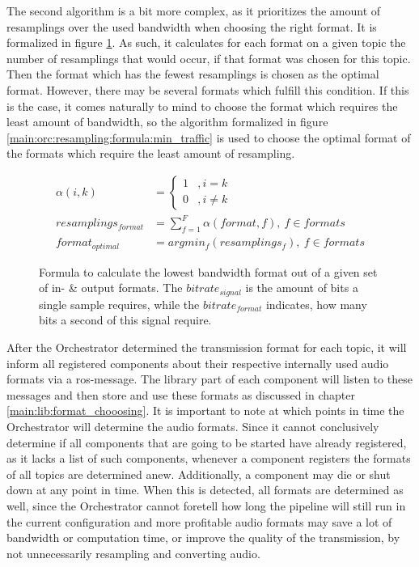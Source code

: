 The second algorithm is a bit more complex, as it prioritizes the amount of resamplings over the used bandwidth when choosing the right format.
It is formalized in figure \ref{main:orc:resampling:formula:min_cpu}.
As such, it calculates for each format on a given topic the number of resamplings that would occur, if that format was chosen for this topic.
Then the format which has the fewest resamplings is chosen as the optimal format.
However, there may be several formats which fulfill this condition.
If this is the case, it comes naturally to mind to choose the format which requires the least amount of bandwidth, so the algorithm formalized in figure \ref{main:orc:resampling:formula:min_traffic} is used to choose the optimal format of the formats which require the least amount of resampling.

\begin{figure}
	\begin{align}
	\alpha(i,k) &=
	\begin{cases}
	1 & , i = k \\
	0 & , i \neq k
	\end{cases} \\[10pt]
	resamplings_{format} &= \sum_{f=1}^{F} \alpha(format, f) ,\ f \in formats\\[10pt]
	format_{optimal} &= argmin_{f}(resamplings_{f}) , \ f \in formats
	\end{align}
	\caption{Formula to calculate the lowest bandwidth format out of a given set of in- \& output formats.
		The $bitrate_{signal}$ is the amount of bits a single sample requires, while the $bitrate_{format}$ indicates, how many bits a second of this signal require.}
	\label{main:orc:resampling:formula:min_cpu}
\end{figure}

After the Orchestrator determined the transmission format for each topic, it will inform all registered components about their respective internally used audio formats via a \gls{ros}-message.
The library part of each component will listen to these messages and then store and use these formats as discussed in chapter \ref{main:lib:format_chooosing}.
It is important to note at which points in time the Orchestrator will determine the audio formats.
Since it cannot conclusively determine if all components that are going to be started have already registered, as it lacks a list of such components, whenever a component registers the formats of all topics are determined anew.
Additionally, a component may die or shut down at any point in time.
When this is detected, all formats are determined as well, since the Orchestrator cannot foretell how long the pipeline will still run in the current configuration and more profitable audio formats may save a lot of bandwidth or computation time, or improve the quality of the transmission, by not unnecessarily resampling and converting audio.  


